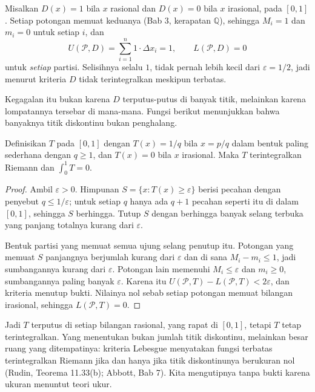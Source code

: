 \begin{contoh}
Misalkan $D(x)=1$ bila $x$ rasional dan $D(x)=0$ bila $x$ irasional, pada $[0,1]$.
Setiap potongan memuat keduanya (Bab 3, kerapatan $\mathbb{Q}$), sehingga $M_i=1$ dan
$m_i=0$ untuk setiap $i$, dan
\[
U(\mathcal{P},D)=\sum_{i=1}^{n}1\cdot\Delta x_i=1,
\qquad
L(\mathcal{P},D)=0
\]
untuk \emph{setiap} partisi. Selisihnya selalu $1$, tidak pernah lebih kecil dari
$\varepsilon=1/2$, jadi menurut kriteria $D$ tidak terintegralkan meskipun terbatas.
\end{contoh}

Kegagalan itu bukan karena $D$ terputus-putus di banyak titik, melainkan karena
lompatannya tersebar di mana-mana. Fungsi berikut menunjukkan bahwa banyaknya titik
diskontinu bukan penghalang.

\begin{teorema}
Definisikan $T$ pada $[0,1]$ dengan $T(x)=1/q$ bila $x=p/q$ dalam bentuk paling
sederhana dengan $q\ge1$, dan $T(x)=0$ bila $x$ irasional. Maka $T$ terintegralkan
Riemann dan $\int_0^1 T=0$.
\end{teorema}

\begin{proof}
Ambil $\varepsilon>0$. Himpunan $S=\{x:T(x)\ge\varepsilon\}$ berisi pecahan dengan
penyebut $q\le1/\varepsilon$; untuk setiap $q$ hanya ada $q+1$ pecahan seperti itu di
dalam $[0,1]$, sehingga $S$ berhingga. Tutup $S$ dengan berhingga banyak selang
terbuka yang panjang totalnya kurang dari $\varepsilon$.

Bentuk partisi yang memuat semua ujung selang penutup itu. Potongan yang memuat $S$
panjangnya berjumlah kurang dari $\varepsilon$ dan di sana $M_i-m_i\le1$, jadi
sumbangannya kurang dari $\varepsilon$. Potongan lain memenuhi $M_i\le\varepsilon$ dan
$m_i\ge0$, sumbangannya paling banyak $\varepsilon$. Karena itu
$U(\mathcal{P},T)-L(\mathcal{P},T)<2\varepsilon$, dan kriteria menutup bukti. Nilainya
nol sebab setiap potongan memuat bilangan irasional, sehingga $L(\mathcal{P},T)=0$.
\end{proof}

Jadi $T$ terputus di setiap bilangan rasional, yang rapat di $[0,1]$, tetapi $T$ tetap
terintegralkan. Yang menentukan bukan jumlah titik diskontinu, melainkan besar ruang
yang ditempatinya: kriteria Lebesgue menyatakan fungsi terbatas terintegralkan Riemann
jika dan hanya jika titik diskontinunya berukuran nol (Rudin, Teorema 11.33(b); Abbott,
Bab 7). Kita mengutipnya tanpa bukti karena ukuran menuntut teori ukur.

